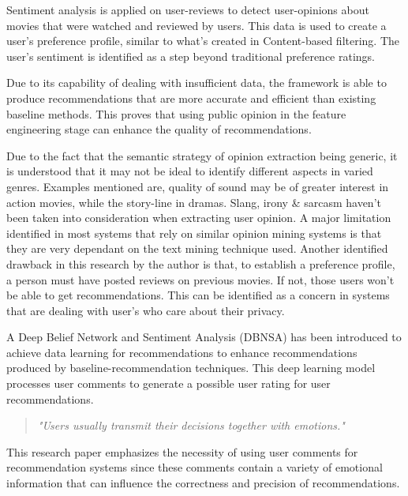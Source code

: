 Sentiment analysis is applied on user-reviews to detect user-opinions about movies that were watched and reviewed by users. This data is used to create a user's preference profile, similar to what's created in Content-based filtering. The user's sentiment is identified as a step beyond traditional preference ratings.

Due to its capability of dealing with insufficient data, the framework is able to produce recommendations that are more accurate and efficient than existing baseline methods. This proves that using public opinion in the feature engineering stage can enhance the quality of recommendations.

Due to the fact that the semantic strategy of opinion extraction being generic, it is understood that it may not be ideal to identify different aspects in varied genres. Examples mentioned are, quality of sound may be of greater interest in action movies, while the story-line in dramas.
Slang, irony \& sarcasm haven't been taken into consideration when extracting user opinion.
A major limitation identified in most systems that rely on similar opinion mining systems is that they are very dependant on the text mining technique used. Another identified drawback in this research by the author is that, to establish a preference profile, a person must have posted reviews on previous movies. If not, those users won't be able to get recommendations. This can be identified as a concern in systems that are dealing with user's who care about their privacy.

\bigbreak

A Deep Belief Network and Sentiment Analysis (DBNSA) has been introduced to achieve data learning for recommendations \autocite{chen_user_2019} to enhance recommendations produced by baseline-recommendation techniques. This deep learning model  processes user comments to generate a possible user rating for user recommendations.

\begin{quote} 
\centering 
\emph{"Users usually transmit their decisions together with emotions."} 
\\
\raggedleft
\autocite{chen_user_2019}
\end{quote}

This research paper emphasizes the necessity of using user comments for recommendation systems since these comments contain a variety of emotional information that can influence the correctness and precision of recommendations.

